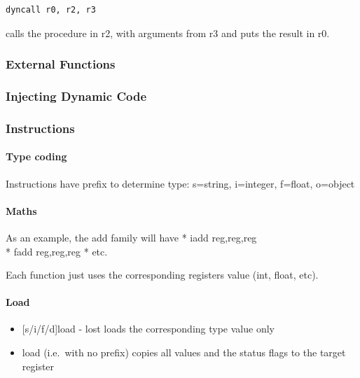 \begin{verbatim}
dyncall r0, r2, r3
\end{verbatim}

calls the procedure in r2, with arguments from r3 and puts the result in
r0.

\hypertarget{external-functions}{%
\subsubsection{External Functions}\label{external-functions}}

\hypertarget{injecting-dynamic-code}{%
\subsubsection{Injecting Dynamic Code}\label{injecting-dynamic-code}}

\hypertarget{instructions-1}{%
\subsubsection{Instructions}\label{instructions-1}}

\hypertarget{type-coding}{%
\paragraph{Type coding}\label{type-coding}}

Instructions have prefix to determine type: s=string, i=integer,
f=float, o=object

\hypertarget{maths}{%
\paragraph{Maths}\label{maths}}

As an example, the add family will have * iadd reg,reg,reg\\
* fadd reg,reg,reg * etc.

Each function just uses the corresponding registers value (int, float,
etc).

\hypertarget{load}{%
\paragraph{Load}\label{load}}

\begin{itemize}
\tightlist
\item
  {[}s/i/f/d{]}load - lost loads the corresponding type value only
\item
  load (i.e.~with no prefix) copies all values and the status flags to the
  target register
\end{itemize}

